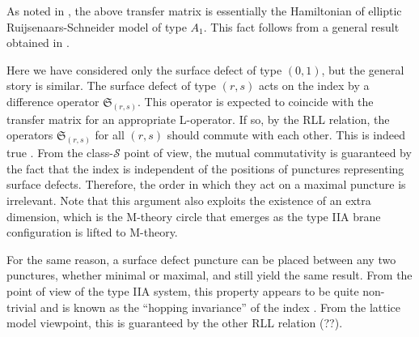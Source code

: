 As noted in \cite{Gaiotto:2012xa}, the above transfer matrix
is essentially the Hamiltonian of elliptic Ruijsenaars-Schneider model
\cite{MR851627,Ruijsenaars:1986pp} of type $A_{1}$. This fact
follows from a general result obtained in \cite{MR1463830}.

Here we have considered only the surface defect of type $(0,1)$,
but the general story is similar. The surface defect of type $(r,s)$
acts on the index by a difference operator $\mathfrak{S}_{(r,s)}$.
This operator is expected to coincide with the transfer matrix for
an appropriate L-operator. If so, by the RLL relation, the operators
$\mathfrak{S}_{(r,s)}$ for all $(r,s)$ should commute with each
other. This is indeed true \cite{Gaiotto:2012xa}. From the class-$\mathcal{S}$
point of view, the mutual commutativity is guaranteed by the fact
that the index is independent of the positions of punctures representing
surface defects. Therefore, the order in which they act on a maximal
puncture is irrelevant. Note that this argument also exploits the
existence of an extra dimension, which is the M-theory circle that
emerges as the type IIA brane configuration is lifted to M-theory.

For the same reason, a surface defect puncture can be placed between
any two punctures, whether minimal or maximal, and still yield the
same result. From the point of view of the type IIA system, this property
appears to be quite non-trivial and is known as the ``hopping invariance''
of the index \cite{Gadde:2013dda}. From the lattice model viewpoint,
this is guaranteed by the other RLL relation (??).












